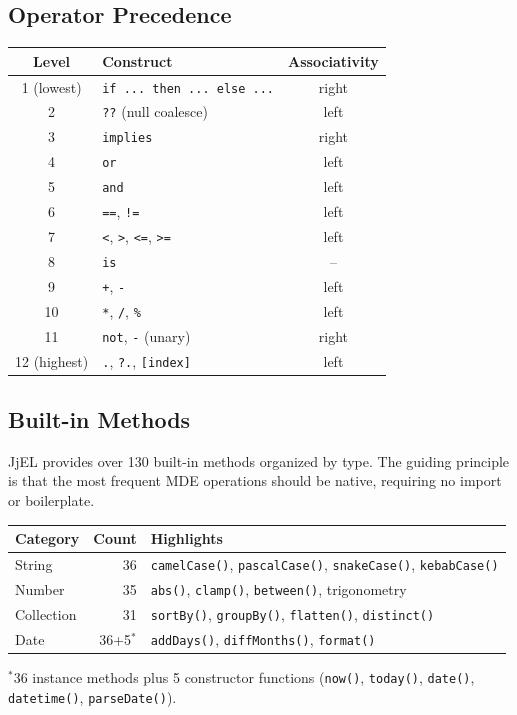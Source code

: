 \documentclass[11pt,a4paper]{article}
\newcommand{\jjel}{\textsf{JjEL}}
\begin{document}
\subsection{Operator Precedence}

\begin{center}
\begin{tabular}{@{}clc@{}}
\toprule
\textbf{Level} & \textbf{Construct} & \textbf{Associativity} \\
\midrule
1 (lowest) & \texttt{if ... then ... else ...} & right \\
2 & \texttt{??} (null coalesce) & left \\
3 & \texttt{implies} & right \\
4 & \texttt{or} & left \\
5 & \texttt{and} & left \\
6 & \texttt{==}, \texttt{!=} & left \\
7 & \texttt{<}, \texttt{>}, \texttt{<=}, \texttt{>=} & left \\
8 & \texttt{is} & -- \\
9 & \texttt{+}, \texttt{-} & left \\
10 & \texttt{*}, \texttt{/}, \texttt{\%} & left \\
11 & \texttt{not}, \texttt{-} (unary) & right \\
12 (highest) & \texttt{.}, \texttt{?.}, \texttt{[index]} & left \\
\bottomrule
\end{tabular}
\end{center}


\subsection{Built-in Methods}

\jjel{} provides over 130 built-in methods organized by type. The guiding principle is that the most frequent MDE operations should be native, requiring no import or boilerplate.

\begin{center}
\begin{tabular}{@{}lrl@{}}
\toprule
\textbf{Category} & \textbf{Count} & \textbf{Highlights} \\
\midrule
String & 36 & \texttt{camelCase()}, \texttt{pascalCase()}, \texttt{snakeCase()}, \texttt{kebabCase()} \\
Number & 35 & \texttt{abs()}, \texttt{clamp()}, \texttt{between()}, trigonometry \\
Collection & 31 & \texttt{sortBy()}, \texttt{groupBy()}, \texttt{flatten()}, \texttt{distinct()} \\
Date & 36+5$^*$ & \texttt{addDays()}, \texttt{diffMonths()}, \texttt{format()} \\
\bottomrule
\end{tabular}

\vspace{4pt}
\footnotesize $^*$36 instance methods plus 5 constructor functions (\texttt{now()}, \texttt{today()}, \texttt{date()}, \texttt{datetime()}, \texttt{parseDate()}).
\end{center}
\end{document}
